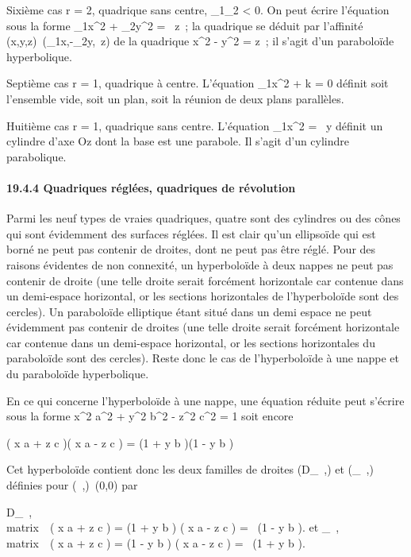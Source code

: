 \documentclass[]{article}
\begin{document}
Sixième cas r = 2, quadrique sans centre, \lambda_1\lambda_2
< 0. On peut écrire l'équation sous la forme
\lambda_1x^2 + \lambda_2y^2 = \beta~z~; la
quadrique se déduit par l'affinité
(x,y,z)\mapsto~(\sqrt\lambda_1x,\sqrt-\lambda_2y,\beta~z)
de la quadrique x^2 - y^2 = z~; il s'agit d'un
paraboloïde hyperbolique.

Septième cas r = 1, quadrique à centre. L'équation
\lambda_1x^2 + k = 0 définit soit l'ensemble vide, soit un
plan, soit la réunion de deux plans parallèles.

Huitième cas r = 1, quadrique sans centre. L'équation
\lambda_1x^2 = \beta~y définit un cylindre d'axe Oz dont la
base est une parabole. Il s'agit d'un cylindre parabolique.

\paragraph{19.4.4 Quadriques réglées, quadriques de révolution}

Parmi les neuf types de vraies quadriques, quatre sont des cylindres ou
des cônes qui sont évidemment des surfaces réglées. Il est clair qu'un
ellipsoïde qui est borné ne peut pas contenir de droites, dont ne peut
pas être réglé. Pour des raisons évidentes de non connexité, un
hyperboloïde à deux nappes ne peut pas contenir de droite (une telle
droite serait forcément horizontale car contenue dans un demi-espace
horizontal, or les sections horizontales de l'hyperboloïde sont des
cercles). Un paraboloïde elliptique étant situé dans un demi espace ne
peut évidemment pas contenir de droites (une telle droite serait
forcément horizontale car contenue dans un demi-espace horizontal, or
les sections horizontales du paraboloïde sont des cercles). Reste donc
le cas de l'hyperboloïde à une nappe et du paraboloïde hyperbolique.

En ce qui concerne l'hyperboloïde à une nappe, une équation réduite peut
s'écrire sous la forme  x^2 \over
a^2 + y^2 \over
b^2 - z^2 \over
c^2 = 1 soit encore

\left ( x \over a + z
\over c \right )\left (
x \over a - z \over c
\right ) = \left (1 + y
\over b \right )\left (1
- y \over b \right )

Cet hyperboloïde contient donc les deux familles de droites
(D_\lambda~,\mu) et (\Delta_\lambda~,\mu) définies pour
(\lambda~,\mu)\neq~(0,0) par

D_\lambda~,\mu \left
\\matrix\,\lambda~\left
( x \over a + z \over c
\right ) = \mu\left (1 + y
\over b \right ) \cr
\cr \mu\left ( x \over a
- z \over c \right ) =
\lambda~\left (1 - y \over b
\right )\right .\quad
\text et \quad \Delta_\lambda~,\mu
\left
\\matrix\,\lambda~\left
( x \over a + z \over c
\right ) = \mu\left (1 - y
\over b \right ) \cr
\cr \mu\left ( x \over a
- z \over c \right ) =
\lambda~\left (1 + y \over b
\right )\right .
\end{document}
